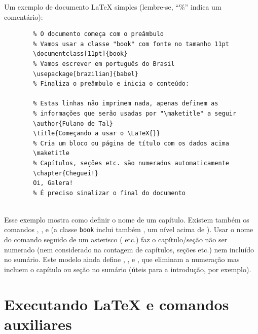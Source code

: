Um exemplo de documento \LaTeX{} simples (lembre-se, ``\%'' indica um
comentário):

\begin{verbatim}
        % O documento começa com o preâmbulo
        % Vamos usar a classe "book" com fonte no tamanho 11pt
        \documentclass[11pt]{book}
        % Vamos escrever em português do Brasil
        \usepackage[brazilian]{babel}
        % Finaliza o preâmbulo e inicia o conteúdo:
        
        % Estas linhas não imprimem nada, apenas definem as
        % informações que serão usadas por "\maketitle" a seguir
        \author{Fulano de Tal}
        \title{Começando a usar o \LaTeX{}}
        % Cria um bloco ou página de título com os dados acima
        \maketitle
        % Capítulos, seções etc. são numerados automaticamente
        \chapter{Cheguei!}
        Oi, Galera!
        % É preciso sinalizar o final do documento
        
\end{verbatim}

Esse exemplo mostra como definir o nome de um capítulo. Existem também os
comandos , ,  e
 (a classe \texttt{book} inclui também , um nível
acima de ). Usar o nome do comando seguido de um asterisco
( etc.) faz o capítulo/seção não ser numerado (nem
considerado na contagem de capítulos, seções etc.) nem incluído no
sumário. Este modelo ainda define , ,
 e , que eliminam a
numeração mas incluem o capítulo ou seção no sumário (úteis para a
introdução, por exemplo).

\section{Executando \LaTeX{} e comandos auxiliares}
\label{sec:make}

\enlargethispage{.5\baselineskip}

